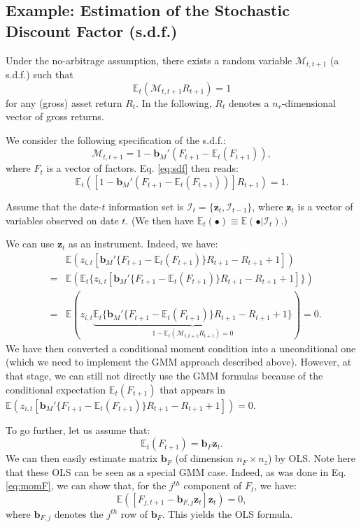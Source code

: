 \documentclass[
  12pt,
]{book}
\theoremstyle{definition}
\theoremstyle{definition}
\theoremstyle{definition}
\theoremstyle{definition}
\theoremstyle{remark}
\begin{document}
\hypertarget{example-estimation-of-the-stochastic-discount-factor-s.d.f.}{%
\subsection{Example: Estimation of the Stochastic Discount Factor (s.d.f.)}\label{example-estimation-of-the-stochastic-discount-factor-s.d.f.}}

Under the no-arbitrage assumption, there exists a random variable \(\mathcal{M}_{t,t+1}\) (a s.d.f.) such that
\[
\mathbb{E}_t(\mathcal{M}_{t,t+1}R_{t+1})=1
\]
for any (gross) asset return \(R_t\). In the following, \(R_t\) denotes a \(n_r\)-dimensional vector of gross returns.

We consider the following specification of the s.d.f.:
\begin{equation}
\mathcal{M}_{t,t+1} = 1 - \textbf{b}_M'(F_{t+1} - \mathbb{E}_t(F_{t+1})), \label{eq:sdf}
\end{equation}
where \(F_t\) is a vector of factors. Eq. \eqref{eq:sdf} then reads:
\[
\mathbb{E}_t([1 - \textbf{b}_M'(F_{t+1} - \mathbb{E}_t(F_{t+1}))]R_{t+1})=1.
\]

Assume that the date-\(t\) information set is \(\mathcal{I}_t=\{\textbf{z}_t,\mathcal{I}_{t-1}\}\), where \(\textbf{z}_t\) is a vector of variables observed on date \(t\). (We then have \(\mathbb{E}_t(\bullet) \equiv \mathbb{E}(\bullet|\mathcal{I}_t)\).)

We can use \(\textbf{z}_t\) as an instrument. Indeed, we have:
\begin{eqnarray}
&&\mathbb{E}(z_{i,t} [\textbf{b}_M'\{F_{t+1} - \mathbb{E}_t(F_{t+1})\}R_{t+1}-R_{t+1}+1]) \nonumber \\
&=&\mathbb{E}(\mathbb{E}_t\{z_{i,t} [\textbf{b}_M'\{F_{t+1} - \mathbb{E}_t(F_{t+1})\}R_{t+1}-R_{t+1}+1]\})\nonumber\\
&=&\mathbb{E}(z_{i,t} \underbrace{\mathbb{E}_t\{\textbf{b}_M'\{F_{t+1} - \mathbb{E}_t(F_{t+1})\}R_{t+1}-R_{t+1}+1\}}_{1 - \mathbb{E}_t(\mathcal{M}_{t,t+1}R_{t+1})=0})=0.\label{eq:momF}
\end{eqnarray}
We have then converted a conditional moment condition into a unconditional one (which we need to implement the GMM approach described above). However, at that stage, we can still not directly use the GMM formulas because of the conditional expectation \(\mathbb{E}_t(F_{t+1})\) that appears in \(\mathbb{E}(z_{i,t} [\textbf{b}_M'\{F_{t+1} - \mathbb{E}_t(F_{t+1})\}R_{t+1}-R_{t+1}+1])=0\).

To go further, let us assume that:
\[
\mathbb{E}_t(F_{t+1}) = \textbf{b}_F \textbf{z}_t.
\]
We can then easily estimate matrix \(\textbf{b}_F\) (of dimension \(n_F \times n_z\)) by OLS. Note here that these OLS can be seen as a special GMM case. Indeed, as was done in Eq. \eqref{eq:momF}, we can show that, for the \(j^{th}\) component of \(F_t\), we have:
\[
\mathbb{E}( [F_{j,t+1} - \textbf{b}_{F,j} \textbf{z}_t]\textbf{z}_{t})=0,
\]
where \(\textbf{b}_{F,j}\) denotes the \(j^{th}\) row of \(\textbf{b}_{F}\). This yields the OLS formula.
\end{document}
